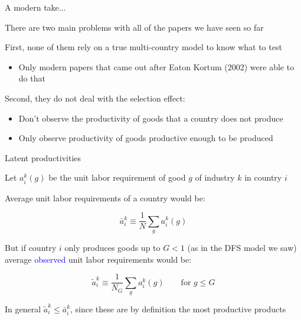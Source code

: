 \documentclass[notes,11pt, aspectratio=169, xcolor=table]{beamer}
\newcommand{\blue}[1]{\textcolor{blue}{#1}}
\newenvironment{wideitemize}{\itemize\addtolength{\itemsep}{10pt}}{\enditemize}
\begin{document}
\begin{frame}{A modern take...}
\begin{wideitemize}
    \item There are two main problems with all of the papers we have seen so far

    \item <2->First, none of them rely on a true multi-country model to know what to test
    \begin{itemize}
        \item Only modern papers that came out after Eaton Kortum (2002) were able to do that 
    \end{itemize}

    \item<3-> Second, they do not deal with the selection effect:
    \begin{itemize}
        \item Don't observe the productivity of goods that a country does not produce
        \item Only observe productivity of goods productive enough to be produced
    \end{itemize}
    
\end{wideitemize}

\end{frame}


\begin{frame}{Latent productivities}
\begin{wideitemize}
    \item Let $a_i^k(g)$ be the unit labor requirement of good $g$ of industry $k$ in country $i$

    \item<2-> Average unit labor requirements of a country would be: 

    \begin{equation*}
        \bar{a}_i^k \equiv \frac{1}{N} \sum_g  a_i^k(g)
    \end{equation*}

    \item<3-> But if country $i$ only produces goods up to $G < 1$ (as in the DFS model we saw) average \blue{observed} unit labor requirements would be:

        \begin{equation*}
        \tilde{a}_i^k \equiv \frac{1}{N_G} \sum_g  a_i^k(g) \qquad \text{for } g \le G  
    \end{equation*}

    \item<4-> In general $\tilde{a}_i^k \le \bar{a}_i^k$, since these are by definition the most productive products

    
\end{wideitemize}

\end{frame}
\end{document}
